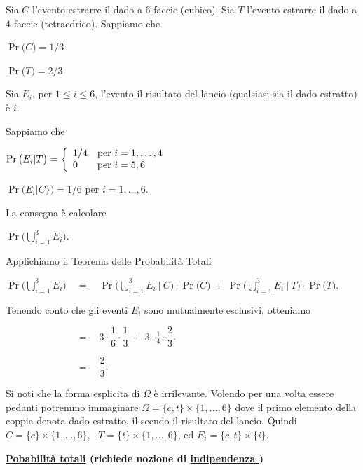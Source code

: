 \documentclass[11pt,openany]{book}
\begin{document}
\begin{soluzione}
Sia $C$ l'evento estrarre il dado a $6$ faccie (cubico). 
Sia $T$ l'evento estrarre il dado a $4$ faccie (tetraedrico). 
Sappiamo che 

\qquad$\Pr\big(C\big)=1/3$ 

\qquad$\Pr\big(T\big)=2/3$ 

Sia $E_i$, per $1\le i\le 6$, l'evento  il risultato del lancio (qualsiasi sia il dado estratto) \`e $i$.

Sappiamo che

\qquad$\Pr\big(E_i\vert T\big)=\left\{
\begin{array}[c]{ll}
    1/4&\textrm{per }i=1,\dots,4\\
    0&\textrm{per }i=5, 6\\
\end{array}\right.$

\qquad$\Pr\big(E_i\vert C\}\big)=1/6$ per $i=1,\dots,6$.

La consegna è calcolare

\qquad$\displaystyle\Pr\bigg(\bigcup_{i=1}^3E_i\bigg)$.

Applichiamo il Teorema delle Probabilità Totali

\qquad$\displaystyle\Pr\bigg(\bigcup_{i=1}^3E_i\bigg)\quad=\quad
\Pr\bigg(\bigcup_{i=1}^3E_i\ \Big|\ C\bigg)\cdot\Pr\big(C\big)\ +\ 
\Pr\bigg(\bigcup_{i=1}^3E_i\ \Big|\ T\bigg)\cdot\Pr\big(T\big)
$.

Tenendo conto che gli eventi $E_i$ sono mutualmente esclusivi, otteniamo

\qquad$\displaystyle\phantom{\Pr\bigg(\bigcup_{i=1}^3E_i\bigg)}\quad=\quad
3\cdot\dfrac16\cdot\dfrac13\ +\ 
3\cdot\frac14\cdot\dfrac23
$.

\qquad$\displaystyle\phantom{\Pr\bigg(\bigcup_{i=1}^3E_i\bigg)}\quad=\quad
\dfrac{2}{3}
$.
\end{soluzione}

Si noti che la forma esplicita di $\Omega$ \`e irrilevante.
Volendo per una volta essere pedanti potremmo immaginare $\Omega=\{c,t\}\times\{1,\dots,6\}$ dove il primo elemento della coppia denota dado estratto, il secndo il risultato del lancio.
Quindi $C=\{c\}\times\{1,\dots,6\}$, \ $T=\{t\}\times\{1,\dots,6\}$, ed $E_i=\{c,t\}\times\{i\}$.


\clearpage
\hfill\textbf{{\color{brown}\hyperref[TeoremaProbabilitaTotali]{Pobabilità totali} \faShare} (richiede nozione di \hyperref[indipendenza]{indipendenza \faShare})}
\end{document}
